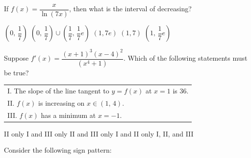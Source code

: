 \begin{questions}
    \question If $f(x) = \dfrac{x}{\ln (7x)}$, then what is the interval of decreasing? \\

    \begin{oneparchoices}
        \choice $\left(0, \, \dfrac{1}{7}\right)$
        \choice $\left(0, \, \dfrac{1}{7}\right) \cup \left(\dfrac{1}{7}, \, \dfrac{1}{7}e\right)$
        \choice $(1, 7e)$
        \choice $(1, 7)$
        \choice $\left(1, \, \dfrac{1}{7}e\right)$
    \end{oneparchoices} \par \horizontalline

    \question Suppose $f'(x) = \dfrac{(x + 1)^3(x - 4)^2}{\left(x^4 + 1\right)}$. Which of the following statements must be true? \begin{center}
        \begin{tabular}{l}
            I. The slope of the line tangent to $y = f(x)$ at $x = 1$ is $36$. \\[11pt]
            II. $f(x)$ is increasing on $x \in (1, \, 4)$. \\[11pt]
            III. $f(x)$ has a minimum at $x = -1$.
        \end{tabular}
    \end{center} \vspace{11pt}

    \begin{oneparchoices}
        \choice II only 
        \choice I and III only
        \choice II and III only 
        \choice I and II only
        \choice I, II, and III
    \end{oneparchoices} \par \horizontalline

    \question Consider the following sign pattern: \\
    \begin{center}
    \end{center} \vspace{11pt}


\end{questions}
